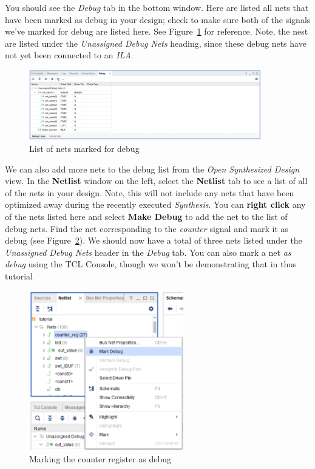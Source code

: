 \documentclass[11pt]{article}
\begin{document}
You should see the \textit{Debug} tab in the bottom window. Here are listed all nets that have been marked as debug in your design; check to make sure both of the signals we've marked for debug are listed here. See Figure~\ref{fig:debug_list} for reference. Note, the nest are listed under the \textit{Unassigned Debug Nets} heading, since these debug nets have not yet been connected to an \textit{ILA}.

\begin{figure}[!h]
    \centering
    \includegraphics[width=0.9\textwidth]{images/debug_list.png}
    \caption{List of nets marked for debug}
    \label{fig:debug_list}
\end{figure}

We can also add more nets to the debug list from the \textit{Open Synthesized Design} view. In the \textbf{Netlist} window on the left, select the \textbf{Netlist} tab to see a list of all of the nets in your design. Note, this will not include any nets that have been optimized away during the recently executed \textit{Synthesis}. You can \textbf{right click} any of the nets listed here and select \textbf{Make Debug} to add the net to the list of debug nets. Find the net corresponding to the \textit{counter} signal and mark it as debug (see Figure~\ref{fig:counter_as_debug}). We should now have a total of three nets listed under the \textit{Unassigned Debug Nets} header in the \textit{Debug} tab. You can also mark a net \textit{as debug} using the TCL Console, though we won't be demonstrating that in thus tutorial

\begin{figure}[!h]
    \centering
    \includegraphics[width=0.6\textwidth]{images/counter_as_debug.png}
    \caption{Marking the counter register as debug}
    \label{fig:counter_as_debug}
\end{figure}
\end{document}
